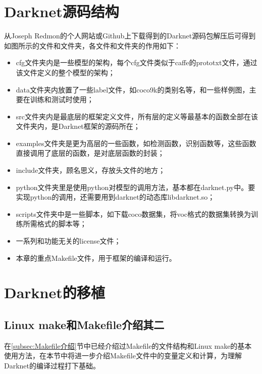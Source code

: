 \section{Darknet源码结构}
从Joseph Redmon的个人网站或Github上下载得到的Darknet源码包解压后可得到如图所示的文件和文件夹，各文件和文件夹的作用如下\cite{darknet_note}：
\begin{itemize}
    \item cfg文件夹内是一些模型的架构，每个cfg文件类似于caffe的prototxt文件，通过该文件定义的整个模型的架构；
    \item data文件夹内放置了一些label文件，如coco9k的类别名等，和一些样例图，主要在训练和测试时使用；
    \item src文件夹内是最底层的框架定义文件，所有层的定义等最基本的函数全部在该文件夹内，是Darknet框架的源码所在；
    \item examples文件夹是更为高层的一些函数，如检测函数，识别函数等，这些函数直接调用了底层的函数，是对底层函数的封装；
    \item include文件夹，顾名思义，存放头文件的地方；
    \item python文件夹里是使用python对模型的调用方法，基本都在darknet.py中。要实现python的调用，还需要用到darknet的动态库libdarknet.so；
    \item scripts文件夹中是一些脚本，如下载coco数据集，将voc格式的数据集转换为训练所需格式的脚本等；
    \item 一系列和功能无关的license文件；
    \item 本章的重点Makefile文件，用于框架的编译和运行。
\end{itemize}

\section{Darknet的移植}
\subsection{Linux make和Makefile介绍其二}
在\ref{subsec:Makefile介绍}节中已经介绍过Makefile的文件结构和Linux make的基本使用方法，在本节中将进一步介绍Makefile文件中的变量定义和计算，为理解Darknet的编译过程打下基础。

